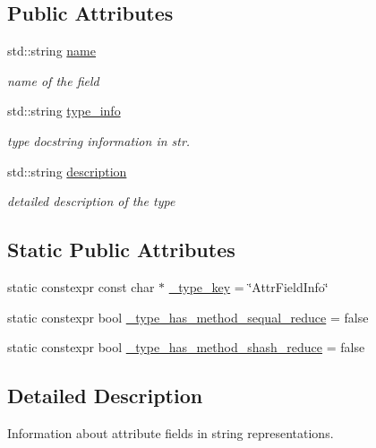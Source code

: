 \subsection*{Public Attributes}
\begin{DoxyCompactItemize}
\item 
std\+::string \hyperlink{classtvm_1_1AttrFieldInfoNode_a94f3593b41c2dd3be2aea793794d4dca}{name}
\begin{DoxyCompactList}\small\item\em name of the field \end{DoxyCompactList}\item 
std\+::string \hyperlink{classtvm_1_1AttrFieldInfoNode_a625467e8153ee8657ae080693baa374c}{type\+\_\+info}
\begin{DoxyCompactList}\small\item\em type docstring information in str. \end{DoxyCompactList}\item 
std\+::string \hyperlink{classtvm_1_1AttrFieldInfoNode_a1a281d5417d10840872e3c2c67c7290b}{description}
\begin{DoxyCompactList}\small\item\em detailed description of the type \end{DoxyCompactList}\end{DoxyCompactItemize}
\subsection*{Static Public Attributes}
\begin{DoxyCompactItemize}
\item 
static constexpr const char $\ast$ \hyperlink{classtvm_1_1AttrFieldInfoNode_afe4293c9f1aea71f845c5ed9633af2c9}{\+\_\+type\+\_\+key} = \char`\"{}Attr\+Field\+Info\char`\"{}
\item 
static constexpr bool \hyperlink{classtvm_1_1AttrFieldInfoNode_afdb98106a5c8d5ad2106fd03043283f7}{\+\_\+type\+\_\+has\+\_\+method\+\_\+sequal\+\_\+reduce} = false
\item 
static constexpr bool \hyperlink{classtvm_1_1AttrFieldInfoNode_a29563a91b0ce0f0118c755e072c10dfc}{\+\_\+type\+\_\+has\+\_\+method\+\_\+shash\+\_\+reduce} = false
\end{DoxyCompactItemize}


\subsection{Detailed Description}
Information about attribute fields in string representations. 

